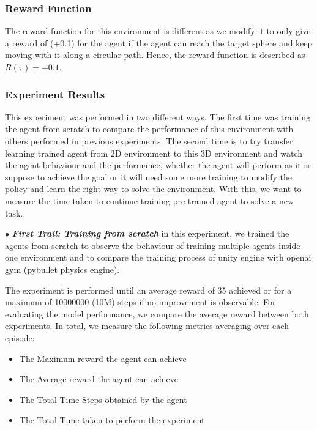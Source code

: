 \subsubsection{Reward Function}

The reward function for this environment is different as we modify it to only give a reward of (+0.1) for the agent if the agent can reach the target sphere and keep moving with it along a circular path. Hence, the reward function is described as \textbf{\(R(\tau)=+0.1\)}.


\subsubsection{Experiment Results}

This experiment was performed in two different ways. The first time was training the agent from scratch to compare the performance of this environment with others performed in previous experiments. The second time is to try transfer learning trained agent from 2D environment to this 3D environment and watch the agent behaviour and the performance, whether the agent will perform as it is suppose to achieve the goal or it will need some more training to modify the policy and learn the right way to solve the environment. With this, we want to measure the time taken to continue training pre-trained agent to solve a new task.

$\bullet$ \textit{\textbf{First Trail: Training from scratch}} in this experiment, we trained the agents from scratch to observe the behaviour of training multiple agents inside one environment and to compare the training process of unity engine with openai gym (pybullet physics engine). 

The experiment is performed until an average reward of 35 achieved or for a maximum of 10000000 (10M) steps if no improvement is observable. For evaluating the model performance, we compare the average reward between both experiments. In total, we measure the following metrics averaging over each episode:
\begin{itemize}
		\item The Maximum reward the agent can achieve
		\item The Average reward the agent can achieve
		\item The Total Time Steps obtained by the agent
		\item The Total Time taken to perform the experiment
\end{itemize}

